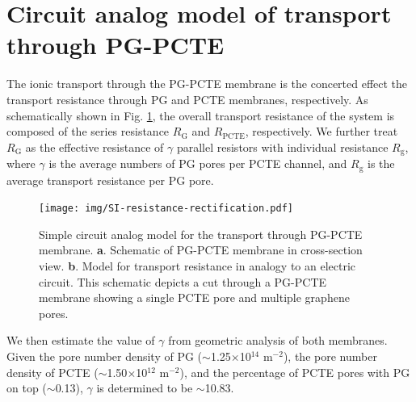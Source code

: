 \documentclass[manuscript=suppinfo,email=true, hyperref=true, keywords=false]{achemso}
\newcommand{\Fig}{Fig.}
\begin{document}
\section{Circuit analog model of transport through PG-PCTE}
\label{sec:R-model}
The ionic transport through the PG-PCTE membrane is the concerted
effect the transport resistance through PG and PCTE membranes,
respectively. As schematically shown in \Fig{} \ref{fig:R-model}, the
overall transport resistance of the system is composed of the series
resistance $R_{\mathrm{G}}$ and $R_{\mathrm{PCTE}}$, respectively. We
further treat $R_{\mathrm{G}}$ as the effective resistance of $\gamma$
parallel resistors with individual resistance $R_{\mathrm{g}}$, where
$\gamma$ is the average numbers of PG pores per PCTE channel, and
$R_{\mathrm{g}}$ is the average transport resistance per PG pore. 
\begin{figure}[htbp]
  \centering
  \texttt{[image: img/SI-resistance-rectification.pdf]}
  \caption{Simple circuit analog model for the transport through
    PG-PCTE membrane. \textbf{a}. Schematic of PG-PCTE membrane in
    cross-section view. \textbf{b}. Model for transport resistance in
    analogy to an electric circuit. This schematic depicts a cut
    through a PG-PCTE membrane showing a single PCTE pore and multiple
    graphene pores.}
  \label{fig:R-model}
\end{figure}
We then estimate the value of $\gamma$ from geometric analysis of both
membranes. Given the pore number density of PG
($\sim$1.25$\times$10$^{14}$ m$^{-2}$), the pore number density of
PCTE ($\sim$1.50$\times$10$^{12}$ m$^{-2}$), and the percentage of
PCTE pores with PG on top ($\sim$0.13), $\gamma$ is determined to be
$\sim$10.83.
\end{document}
